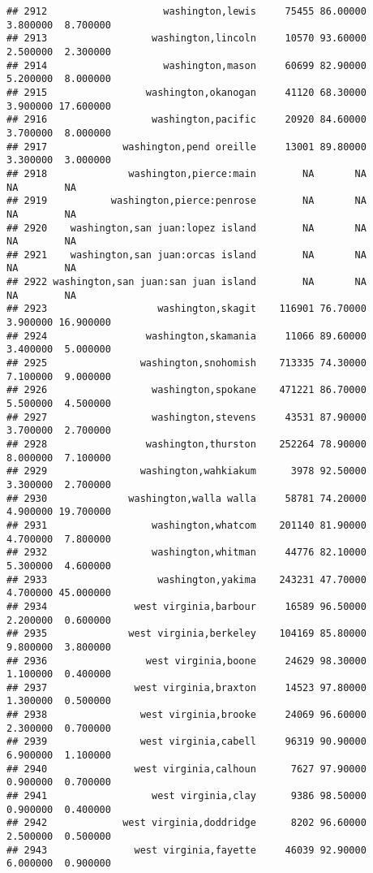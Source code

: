 \documentclass[
]{article}
\begin{document}
\begin{verbatim}
## 2912                    washington,lewis     75455 86.00000  3.800000  8.700000
## 2913                  washington,lincoln     10570 93.60000  2.500000  2.300000
## 2914                    washington,mason     60699 82.90000  5.200000  8.000000
## 2915                 washington,okanogan     41120 68.30000  3.900000 17.600000
## 2916                  washington,pacific     20920 84.60000  3.700000  8.000000
## 2917             washington,pend oreille     13001 89.80000  3.300000  3.000000
## 2918              washington,pierce:main        NA       NA        NA        NA
## 2919           washington,pierce:penrose        NA       NA        NA        NA
## 2920    washington,san juan:lopez island        NA       NA        NA        NA
## 2921    washington,san juan:orcas island        NA       NA        NA        NA
## 2922 washington,san juan:san juan island        NA       NA        NA        NA
## 2923                   washington,skagit    116901 76.70000  3.900000 16.900000
## 2924                 washington,skamania     11066 89.60000  3.400000  5.000000
## 2925                washington,snohomish    713335 74.30000  7.100000  9.000000
## 2926                  washington,spokane    471221 86.70000  5.500000  4.500000
## 2927                  washington,stevens     43531 87.90000  3.700000  2.700000
## 2928                 washington,thurston    252264 78.90000  8.000000  7.100000
## 2929                washington,wahkiakum      3978 92.50000  3.300000  2.700000
## 2930              washington,walla walla     58781 74.20000  4.900000 19.700000
## 2931                  washington,whatcom    201140 81.90000  4.700000  7.800000
## 2932                  washington,whitman     44776 82.10000  5.300000  4.600000
## 2933                   washington,yakima    243231 47.70000  4.700000 45.000000
## 2934               west virginia,barbour     16589 96.50000  2.200000  0.600000
## 2935              west virginia,berkeley    104169 85.80000  9.800000  3.800000
## 2936                 west virginia,boone     24629 98.30000  1.100000  0.400000
## 2937               west virginia,braxton     14523 97.80000  1.300000  0.500000
## 2938                west virginia,brooke     24069 96.60000  2.300000  0.700000
## 2939                west virginia,cabell     96319 90.90000  6.900000  1.100000
## 2940               west virginia,calhoun      7627 97.90000  0.900000  0.700000
## 2941                  west virginia,clay      9386 98.50000  0.900000  0.400000
## 2942             west virginia,doddridge      8202 96.60000  2.500000  0.500000
## 2943               west virginia,fayette     46039 92.90000  6.000000  0.900000

\end{verbatim}
\end{document}

